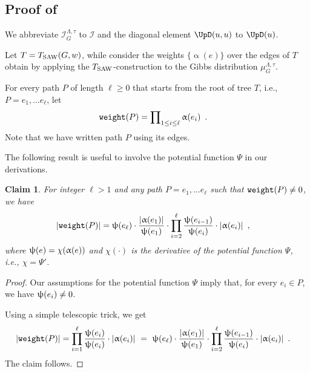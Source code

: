 \documentclass[11pt,reqno]{amsart}
\numberwithin{equation}{section}
\newtheorem{claim}[theorem]{Claim}
\newcommand{\cI}{{\mathcal{I}}}
\newcommand{\applegreen}[1]{ {\color{applegreen}#1}}
\newcommand{\blue}[1]{{\color{blue}#1}}
\newcommand{\capri}[1]{{\color{capri}#1}}
\newcommand{\goldenbrown}[1]{{\color{goldenbrown}#1}}
\newcommand{\red}[1]{{\color{red}#1}}
\newcommand{\potF}{{\Psi}}
\newcommand{\xdpotF}{\chi}
\newcommand{\Tsaw}{T_{\rm SAW}}
\newcommand{\infmatrix}{\cI}
\newcommand{\abs}[1]{\blue{|}#1\blue{|}}
\renewcommand{\applegreen}[1]{#1}
\renewcommand{\blue}[1]{#1}
\renewcommand{\capri}[1]{#1}
\renewcommand{\goldenbrown}[1]{#1}
\renewcommand{\red}[1]{#1}
\newcommand{\ke}{\blue{e}}
\newcommand{\ki}{\capri{i}}
\newcommand{\kell}{{\color{green(pigment)}\ell}}%
\newcommand{\kP}{\goldenbrown{P}}
\newcommand{\ku}{\red{u}}
\newcommand{\kw}{\blue{w}}
\renewcommand{\ke}{e}
\renewcommand{\ki}{i}
\renewcommand{\kell}{\ell}
\renewcommand{\kP}{P}
\renewcommand{\ku}{u}
\renewcommand{\kw}{w}
\newcommand{\infweight}{\upalpha}
\begin{document}
\subsection{Proof of }\label{sec:thrm:InflNormBound4GeneralD}


We abbreviate $\infmatrix^{\Lambda, \tau}_G$ to $\infmatrix$ and the diagonal element $\UpD (\ku,\ku)$ to $\UpD (\ku)$. 



%
Let $T=\Tsaw(G,\kw)$, while consider the weights $\{\infweight(e)\}$ over the edges of $T$ obtain 
by applying the $\Tsaw$-construction to the Gibbs distribution $\mu^{\Lambda,\tau}_G$.



For every path $\kP$ of length $\kell\geq 0$ that starts from the root of tree $T$, i.e., $\kP=\ke_1, \ldots \ke_{\kell}$, let 
\begin{align}\label{eq:WeightPVsInfls}
 {\tt weight}(\kP) & = \prod\nolimits_{1\leq \ki \leq \kell }\infweight(e_{\ki}) \enspace.
\end{align}
Note that we have written path $\kP$ using its edges. 

The following result is useful to involve the potential function $\potF$ in our derivations. 

 



\begin{claim}\label{claim:AddPotentialA}
For integer $\kell>1$ and any path $\kP=\ke_1, \ldots \ke_{\kell}$ such that ${\tt weight}(\kP)\neq 0$,  we have 
\begin{align} \nonumber
\abs{ {\tt weight}(\kP)} &=\chiofh(\ke_{\kell}) \cdot \frac{\abs{\infweight(\ke_1)}}{\chiofh(\ke_1)} \cdot\prod^{\kell}_{\ki=2}\frac{\chiofh(\ke_{\ki-1})}{\chiofh(\ke_{\ki})} \cdot \abs{\infweight(\ke_{\ki})} \enspace, 
\end{align}
where $\chiofh(\ke)=\xdpotF(\infweight(\ke))$ and $\xdpotF(\cdot )$ is the derivative of the potential function $\potF$, i.e., $\xdpotF=\potF'$. 
\end{claim} 



\begin{proof}
Our assumptions for the potential function $\potF$ imply that, for every $\ke_{\ki}\in \kP$, we have $\chiofh(\ke_{\ki})\neq 0$. 

Using a simple telescopic trick, we get 
\begin{align}
\abs{{\tt weight}(\kP)}&= \prod^{\kell}_{\ki=1}\frac{\chiofh(\ke_{\ki})}{\chiofh(\ke_{\ki})} \cdot \abs{\infweight(\ke_{\ki})} \ 
 = \ \chiofh(\ke_{\kell})\cdot \frac{\abs{\infweight(\ke_1)}}{\chiofh(e_1)}\cdot \prod^{\kell}_{\ki=2}\frac{\chiofh(\ke_{\ki-1})}{\chiofh(\ke_{\ki})}\cdot \abs{\infweight(\ke_{\ki})} \enspace. \nonumber
\end{align}
The claim follows.
\end{proof}
\end{document}
